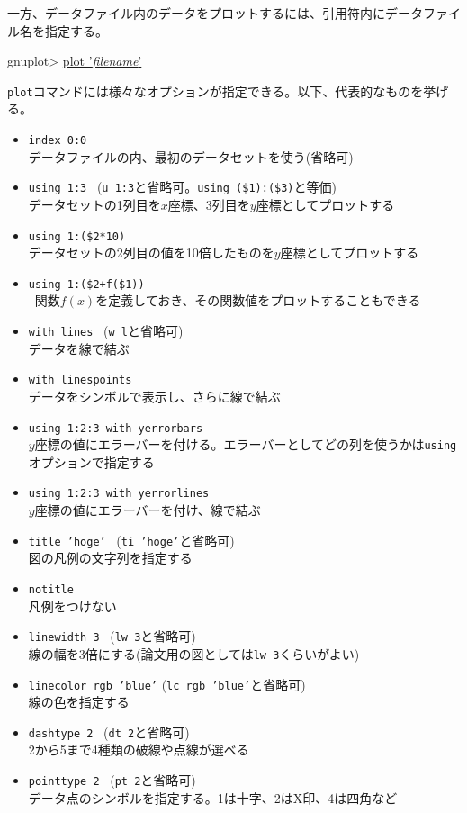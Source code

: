一方、データファイル内のデータをプロットするには、引用符内にデータファイル名を指定する。
\begin{commandline2}
    gnuplot> \underline{plot '\textit{filename}'}
\end{commandline2} \noindent
\texttt{plot}コマンドには様々なオプションが指定できる。以下、代表的なものを挙げる。
\begin{itemize}
    \item \texttt{index 0:0} \\
          データファイルの内、最初のデータセットを使う(省略可)
    \item \texttt{using 1:3} \ (\texttt{u 1:3}と省略可。\texttt{using (\$1):(\$3)}と等価) \\
          データセットの1列目を\(x\)座標、3列目を\(y\)座標としてプロットする
    \item \texttt{using 1:(\$2*10)} \\
          データセットの2列目の値を10倍したものを\(y\)座標としてプロットする
    \item \texttt{using 1:(\$2+f(\$1))} \\\
          関数\(f(x)\)を定義しておき、その関数値をプロットすることもできる
    \item \texttt{with lines} \ (\texttt{w l}と省略可) \\
          データを線で結ぶ
    \item \texttt{with linespoints} \\
          データをシンボルで表示し、さらに線で結ぶ
    \item \texttt{using 1:2:3 with yerrorbars} \\
          \(y\)座標の値にエラーバーを付ける。エラーバーとしてどの列を使うかは\texttt{using}オプションで指定する
    \item \texttt{using 1:2:3 with yerrorlines} \\
          \(y\)座標の値にエラーバーを付け、線で結ぶ
    \item \texttt{title 'hoge'} \ (\texttt{ti 'hoge'}と省略可) \\
          図の凡例の文字列を指定する
    \item \texttt{notitle} \\
          凡例をつけない
    \item \texttt{linewidth 3} \ (\texttt{lw 3}と省略可) \\
          線の幅を3倍にする(論文用の図としては\texttt{lw 3}くらいがよい)
    \item \texttt{linecolor rgb 'blue'} (\texttt{lc rgb 'blue'}と省略可) \\
          線の色を指定する
    \item \texttt{dashtype 2} \ (\texttt{dt 2}と省略可) \\
          2から5まで4種類の破線や点線が選べる
    \item \texttt{pointtype 2} \ (\texttt{pt 2}と省略可) \\
          データ点のシンボルを指定する。1は十字、2はX印、4は四角など
\end{itemize}
